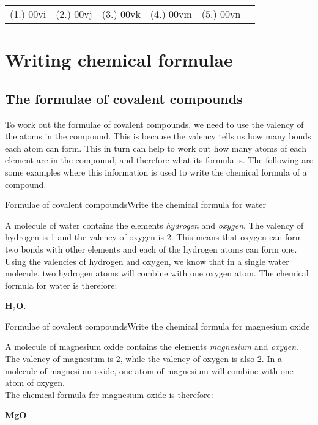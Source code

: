 {\begin{tabular}[h]{cccccc}
(1.) 00vi & (2.) 00vj & (3.) 00vk & (4.) 00vm & (5.) 00vn & 
 \end{tabular}
}







\section{Writing chemical formulae}

\subsection{The formulae of covalent compounds}

To work out the formulae of covalent compounds, we need to use the valency of the atoms in the compound. This is because the valency tells us how many bonds each atom can form. This in turn can help to work out how many atoms of each element are in the compound, and therefore what its formula is. The following are some examples where this information is used to write the chemical formula of a compound.\\

\begin{wex}{Formulae of covalent compounds}{Write the chemical formula for water\\}
{
A molecule of water contains the elements \textit{hydrogen} and \textit{oxygen}.
The valency of hydrogen is 1 and the valency of oxygen is 2. This means that oxygen can form two bonds with other elements and each of the hydrogen atoms can form one.
Using the valencies of hydrogen and oxygen, we know that in a single water molecule, two hydrogen atoms will combine with one oxygen atom. The chemical formula for water is therefore:
\begin{center}
\textbf{H$_2$O}.
\end{center}}
\end{wex}

\begin{wex}{Formulae of covalent compounds}{Write the chemical formula for magnesium oxide\\}
{
A molecule of magnesium oxide contains the elements \textit{magnesium} and \textit{oxygen}.
The valency of magnesium is
2, while the valency of oxygen is also 2. In a molecule of magnesium oxide, one atom of magnesium will combine with one atom
of oxygen. \\
The chemical formula for magnesium oxide is therefore:

\begin{center}
\textbf{MgO}
\end{center}}
\end{wex}

